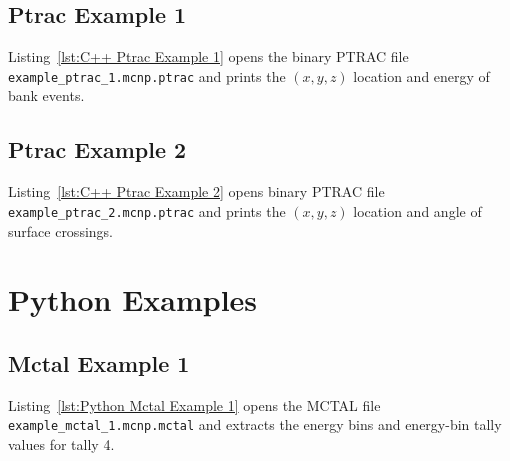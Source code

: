 \documentclass[11pt]{article}
\begin{document}
\clearpage
\subsection{Ptrac Example 1}\label{ptrac-example-1}

Listing~\ref{lst:C++ Ptrac Example 1} opens the binary PTRAC file
\texttt{example\_ptrac\_1.mcnp.ptrac} and prints the $\left(x,y,z\right)$
location and energy of bank events.



\clearpage
\subsection{Ptrac Example 2}\label{ptrac-example-2}

Listing~\ref{lst:C++ Ptrac Example 2} opens binary PTRAC file
\texttt{example\_ptrac\_2.mcnp.ptrac} and prints the $\left(x,y,z\right)$
location and angle of surface crossings.



\clearpage
\section{Python Examples}\label{python-examples}

\subsection{Mctal Example 1}\label{mctal-example-1-1}

Listing~\ref{lst:Python Mctal Example 1} opens the MCTAL file
\texttt{example\_mctal\_1.mcnp.mctal} and extracts the energy bins and
energy-bin tally values for tally 4.


\end{document}
